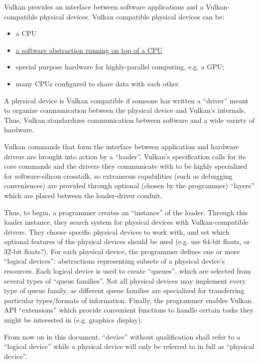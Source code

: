 \documentclass[12pt,letterpaper]{article}
\newcommand{\inquotes}[1]{``#1''}	%
\begin{document}
Vulkan provides an interface between software applications and a Vulkan-compatible physical devices. Vulkan compatible physical devices can be:
	\begin{itemize}
		\item a CPU
		\item \href{https://www.reddit.com/r/vulkan/comments/5f7jhn/is_it_possible_to_run_vulkan_on_cpu/}{a software abstraction running on top of a CPU}
		\item special purpose hardware for highly-parallel computing, e.g. a GPU;
		\item many CPUs configured to share data with each other
	\end{itemize}
A physical device is Vulkan compatible if someone has written a \inquotes{driver} meant to organize communication between the physical device and Vulkan's internals. Thus, Vulkan standardizes communication between software and a wide variety of hardware.

Vulkan commands that form the interface between application and hardware drivers are brought into action by a \inquotes{loader}. Vulkan's specification calls for its core commands and the drivers they communicate with to be highly specialized for software-silicon crosstalk, so extraneous capabilities (such as debugging conveniences) are provided through optional (chosen by the programmer) \inquotes{layers} which are placed between the loader-driver conduit.    

Thus, to begin, a programmer creates an \inquotes{instance} of the loader. Through this loader instance, they search system for physical devices with Vulkan-compatible drivers. They choose specific physical devices to work with, and set which optional features of the physical devices should be used (e.g. use 64-bit floats, or 32-bit floats?). For each physical device, the programmer defines one or more \inquotes{logical devices}: abstractions representing subsets of a physical device's resources. Each logical device is used to create \inquotes{queues}, which are selected from several types of \inquotes{queue families}. Not all physical devices may implement every type of queue family, as different queue families are specialized for transferring particular types/formats of information. Finally, the programmer enables Vulkan API \inquotes{extensions} which provide convenient functions to handle certain tasks they might be interested in (e.g. graphics display).

From now on in this document, \inquotes{device} without qualification shall refer to a \inquotes{logical device} while a physical device will only be referred to in full as \inquotes{physical device}.
\end{document}
